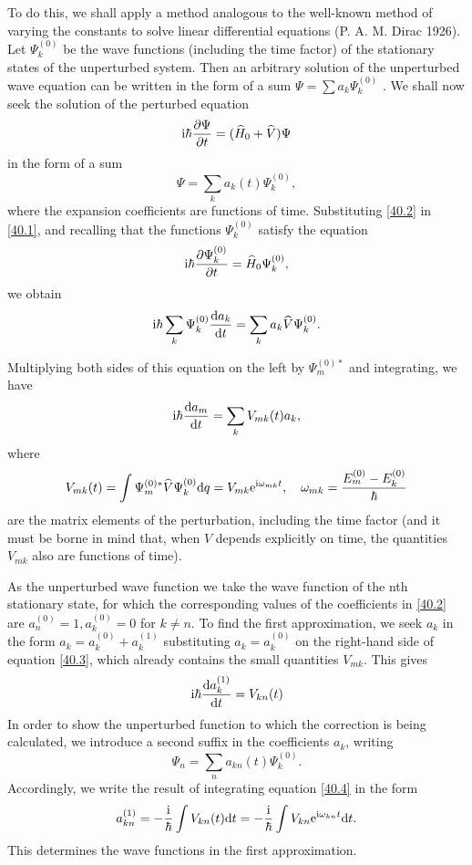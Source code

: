 To do this, we shall apply a method analogous to the well-known method of varying the constants to solve linear differential equations (P. A. M. Dirac 1926). Let $ \Psi_k^{(0)} $ be the wave functions (including the time factor) of the stationary states of the unperturbed system. Then an arbitrary solution of the unperturbed wave equation can be written in the form of a sum $ \Psi=\sum a_k\Psi_k^{(0)} $ . We shall now seek the solution of the perturbed equation
\begin{equation}\label{40.1}
\mathrm{i}\hbar\frac{\partial\Psi}{\partial t}=(\widehat{H}_0+\widehat{V})\Psi
\end{equation}
in the form of a sum
\begin{equation}\label{40.2}
\Psi=\sum_ka_k(t)\Psi_k^{(0)},
\end{equation}
where the expansion coefficients are functions of time. Substituting \eqref{40.2} in \eqref{40.1}, and recalling that the functions $ \Psi_k^{(0)} $ satisfy the equation
\[ \mathrm{i}\hbar\frac{\partial\Psi_k^{(0)}}{\partial t}=\widehat{H}_0\Psi_k^{(0)}, \]
we obtain
\[ \mathrm{i}\hbar\sum_k\Psi_k^{(0)}\frac{\mathrm{d} a_k}{\mathrm{d} t}=\sum_k a_k\widehat{V}\Psi_k^{(0)}. \]



Multiplying both sides of this equation on the left by $ \Psi_m^{(0)*} $ and integrating, we have
\begin{equation}\label{40.3}
\mathrm{i}\hbar\frac{\mathrm{d} a_m}{\mathrm{d} t}=\sum_k V_{mk}(t)a_k,
\end{equation}
where
\[ V_{mk}(t)=\int\Psi_m^{(0)*}\widehat{V}\Psi_k^{(0)}\mathrm{d} q=V_{mk}\mathrm{e}^{\mathrm{i}\omega_{mk}t},\quad\omega_{mk}=\frac{E_m^{(0)}-E_k^{(0)}}{\hbar} \]
are the matrix elements of the perturbation, including the time factor (and it must be borne in mind that, when $ V $ depends explicitly on time, the quantities $ V_{mk} $ also are functions of time).

As the unperturbed wave function we take the wave function of the nth stationary state, for which the corresponding values of the coefficients in \eqref{40.2} are $ a_n^{(0)} = 1, a_k^{(0)} = 0 $ for $ k \ne n $. To find the first approximation, we seek $ a_k $ in the form $ a_k = a_k^{(0)} + a_k^{(1)} $ substituting $ a_k = a_k^{(0)} $ on the right-hand side of equation \eqref{40.3}, which already contains the small quantities $ V_{mk} $. This gives
\begin{equation}\label{40.4}
\mathrm{i}\hbar\frac{\mathrm{d} a_k^{(1)}}{\mathrm{d} t}=V_{kn}(t)
\end{equation}
In order to show the unperturbed function to which the correction is being calculated, we introduce a second suffix in the coefficients $ a_k $, writing
\[ \Psi_n=\sum_n a_{kn}(t)\Psi_k^{(0)}. \]
Accordingly, we write the result of integrating equation \eqref{40.4} in the form
\begin{equation}\label{40.5}
a_{kn}^{(1)}=-\frac{\mathrm{i}}{\hbar}\int V_{kn}(t)\mathrm{d} t=-\frac{\mathrm{i}}{\hbar}\int V_{kn}\mathrm{e}^{\mathrm{i}\omega_{kn}t}\mathrm{d} t.
\end{equation}
This determines the wave functions in the first approximation.

